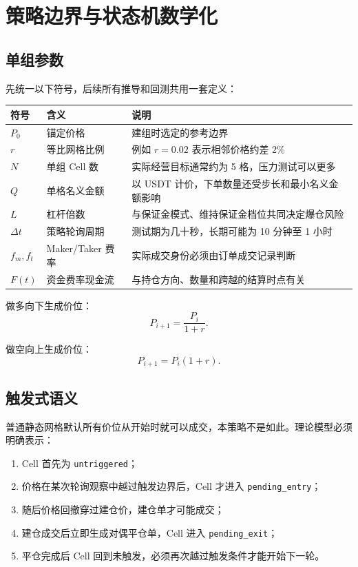 \documentclass[11pt,a4paper,fontset=none]{ctexart}
\begin{document}
\section{策略边界与状态机数学化}

\subsection{单组参数}

先统一以下符号，后续所有推导和回测共用一套定义：

\begin{longtable}{p{2.2cm}p{4.3cm}p{7.2cm}}
  \toprule
  符号 & 含义 & 说明 \\
  \midrule
  \endhead
  $P_0$ & 锚定价格 & 建组时选定的参考边界 \\
  $r$ & 等比网格比例 & 例如 $r=0.02$ 表示相邻价格约差 2\% \\
  $N$ & 单组 Cell 数 & 实际经营目标通常约为 5 格，压力测试可以更多 \\
  $Q$ & 单格名义金额 & 以 USDT 计价，下单数量还受步长和最小名义金额影响 \\
  $L$ & 杠杆倍数 & 与保证金模式、维持保证金档位共同决定爆仓风险 \\
  $\Delta t$ & 策略轮询周期 & 测试期为几十秒，长期可能为 10 分钟至 1 小时 \\
  $f_m,f_t$ & Maker/Taker 费率 & 实际成交身份必须由订单成交记录判断 \\
  $F(t)$ & 资金费率现金流 & 与持仓方向、数量和跨越的结算时点有关 \\
  \bottomrule
\end{longtable}

做多向下生成价位：
\begin{equation}
  P_{i+1}=\frac{P_i}{1+r}.
\end{equation}

做空向上生成价位：
\begin{equation}
  P_{i+1}=P_i(1+r).
\end{equation}

\subsection{触发式语义}

普通静态网格默认所有价位从开始时就可以成交，本策略不是如此。理论模型必须明确表示：

\begin{enumerate}
  \item Cell 首先为 \texttt{untriggered}；
  \item 价格在某次轮询观察中越过触发边界后，Cell 才进入 \texttt{pending\_entry}；
  \item 随后价格回撤穿过建仓价，建仓单才可能成交；
  \item 建仓成交后立即生成对偶平仓单，Cell 进入 \texttt{pending\_exit}；
  \item 平仓完成后 Cell 回到未触发，必须再次越过触发条件才能开始下一轮。
\end{enumerate}
\end{document}
